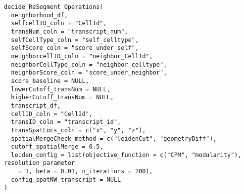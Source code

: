 \documentclass[letterpaper]{book}
\begin{document}
%
\begin{Usage}
\begin{verbatim}
decide_ReSegment_Operations(
  neighborhood_df,
  selfcellID_coln = "CellId",
  transNum_coln = "transcript_num",
  selfCellType_coln = "self_celltype",
  selfScore_coln = "score_under_self",
  neighborcellID_coln = "neighbor_CellId",
  neighborCellType_coln = "neighbor_celltype",
  neighborScore_coln = "score_under_neighbor",
  score_baseline = NULL,
  lowerCutoff_transNum = NULL,
  higherCutoff_transNum = NULL,
  transcript_df,
  cellID_coln = "CellId",
  transID_coln = "transcript_id",
  transSpatLocs_coln = c("x", "y", "z"),
  spatialMergeCheck_method = c("leidenCut", "geometryDiff"),
  cutoff_spatialMerge = 0.5,
  leiden_config = list(objective_function = c("CPM", "modularity"), resolution_parameter
    = 1, beta = 0.01, n_iterations = 200),
  config_spatNW_transcript = NULL
)
\end{verbatim}
\end{Usage}
%
\end{document}
